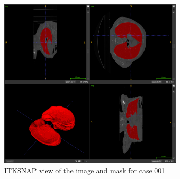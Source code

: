 \documentclass[11pt]{article}
\begin{document}
\begin{figure}[H]
    \centering
    \includegraphics[width=0.8\textwidth]{figs/itksnap.png}
    \caption{ITKSNAP view of the image and mask for case 001}
    \label{fig:itksnap}
\end{figure}
\end{document}
